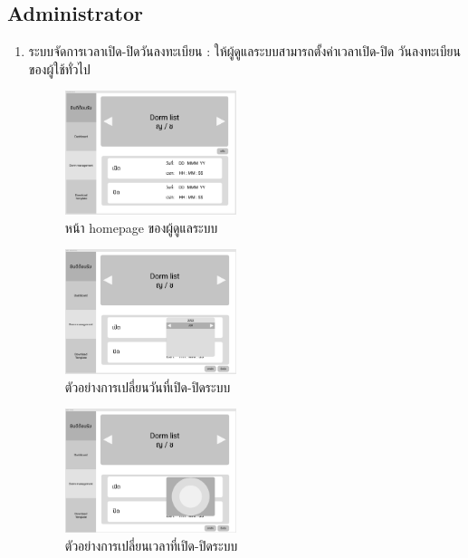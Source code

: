\subsection{Administrator}
\begin{enumerate}
  \item ระบบจัดการเวลาเปิด-ปิดวันลงทะเบียน : ให้ผู้ดูแลระบบสามารถตั้งค่าเวลาเปิด-ปิด
  วันลงทะเบียนของผู้ใช้ทั่วไป
  \begin{figure}[h]
  \begin{center}
  \includegraphics[width=50mm,scale=0.5]{photo/adminDashboard.png}
  \end{center}
  \caption{หน้า homepage ของผู้ดูแลระบบ}
  \label{fig:dashboard}
  \end{figure}
  \begin{figure}[h]
  \begin{center}
  \includegraphics[width=50mm,scale=0.5]{photo/datepicker.png}
  \end{center}
  \caption{ตัวอย่างการเปลี่ยนวันที่เปิด-ปิดระบบ}
  \label{fig:datepicker}
  \end{figure}
  \begin{figure}[h]
  \begin{center}
  \includegraphics[width=50mm,scale=0.5]{photo/timepicker.png}
  \end{center}
  \caption{ตัวอย่างการเปลี่ยนเวลาที่เปิด-ปิดระบบ}
  \label{fig:timepicker}

\end{figure}
\end{enumerate}
